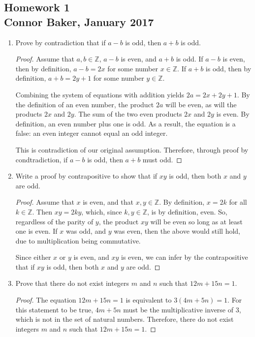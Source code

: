 \documentclass[10pt]{article}
\theoremstyle{definition}
\theoremstyle{plain}
\newcommand{\Z}{\mathbb{Z}}
\begin{document}
\begin{center}
\subsection*{Homework 1\\Connor Baker, January 2017}
\end{center}

\begin{enumerate}
\item Prove by contradiction that if $a-b$ is odd, then $a+b$ is odd.
  \begin{proof}
    Assume that $a,b\in\Z$, $a-b$ is even, and $a+b$ is odd. If $a-b$ is even, then by definition, $a-b=2x$ for some number $x\in\Z$. If $a+b$ is odd, then by definition, $a+b=2y+1$ for some number $y\in\Z$.
    \\
    \par Combining the system of equations with addition yields $2a=2x+2y+1$. By the definition of an even number, the product $2a$ will be even, as will the products $2x$ and $2y$. The sum of the two even products $2x$ and $2y$ is even. By definition, an even number plus one is odd. As a result, the equation is a false: an even integer cannot equal an odd integer.
    \\
    \par This is contradiction of our original assumption. Therefore, through proof by condtradiction, if $a-b$ is odd, then $a+b$ must odd.
  \end{proof}

\item Write a proof by contrapositive to show that if $xy$ is odd, then both $x$ and $y$ are odd.
  \begin{proof}
    Assume that $x$ is even, and that $x,y\in\Z$. By definition, $x=2k$ for all $k\in\Z$. Then $xy=2ky$, which, since $k,y\in\Z$, is by definition, even. So, regardless of the parity of $y$, the product $xy$ will be even so long as at least one is even. If $x$ was odd, and $y$ was even, then the above would still hold, due to multiplication being commutative.
    \\
    \par Since either $x$ or $y$ is even, and $xy$ is even, we can infer by the contrapositive that if $xy$ is odd, then both $x$ and $y$ are odd.
  \end{proof}

\item Prove that there do not exist integers $m$ and $n$ such that $12m + 15n = 1$.
  \begin{proof}
    The equation $12m + 15n = 1$ is equivalent to $3(4m+5n)=1$. For this statement to be true, $4m+5n$ must be the multiplicative inverse of $3$, which is not in the set of natural numbers. Therefore, there do not exist integers $m$ and $n$ such that $12m + 15n = 1$.
  \end{proof}


\end{enumerate}
\end{document}

